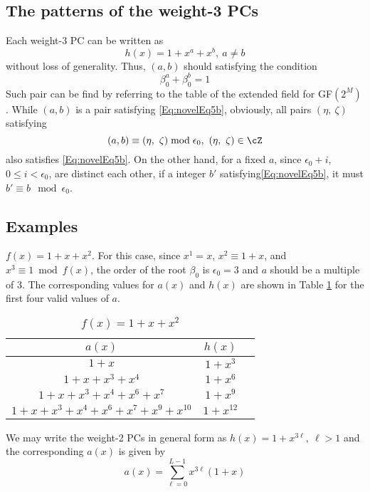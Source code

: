 \subsection{The patterns of the weight-3 PCs}

Each weight-3 PC can be written as 
\begin{equation}
h(x)=1+x^a+x^b,~a\neq b
\label{novelEqwt3}
\end{equation}
without loss of generality. 
Thus, $(a,b)$ should satisfying the condition
\begin{equation}
\beta_0^a+\beta_0^b= 1
\label{Eq:novelEq5b}
\end{equation}
Such pair can be find by referring to the table of the extended field for GF$(2^M)$. While $(a,b)$ is a pair satisfying \eqref{Eq:novelEq5b}, obviously, all pairs $(\eta,~\zeta)$ satisfying
\begin{equation}
(a,b) \equiv (\eta,~\zeta) \bmod \epsilon_0,~(\eta,~\zeta)\in \cZ
\end{equation}
also satisfies \eqref{Eq:novelEq5b}. On the other hand, for a fixed $a$, since $\epsilon_0+i$, $0 \leq i < \epsilon_0$, are distinct each other, if a integer $b'$ satisfying\eqref{Eq:novelEq5b}, it must $b'\equiv b \mod \epsilon_0$.

\subsection{Examples}


\begin{example}$f(x)=1+x+x^2$.\newline 
	For this case, since $x^1=x$, $x^2 \equiv 1+x$, and $x^3 \equiv 1 \bmod f(x)$, the order of the root $\beta_0$ is $\epsilon_0=3$ and $a$ should be a multiple of $3$. The corresponding values for $a(x)$ and $h(x)$ are shown in Table \ref{novelTab2} for the first four valid values of $a$.
	\begin{table}[htbp]
		\caption{$f(x)=1+x+x^2$}
		\centering
		\begin{tabular}{c c c} 
			$a(x)$ & $h(x)$ \\ [0.5ex] 
			\hline\hline
			$1+x$
			& $1+x^{3}$ \\
			\hline
			$1+x+x^3+x^4$
			& $1+x^{6}$ 
			\\
			\hline
			$1+x+x^3+x^4+x^6+x^{7}$ 
			&  $1+x^{9}$ 
			\\
			\hline
			$1+x+x^3+x^4+x^6+x^{7}+x^9+x^{10}$
			&  $1+x^{12}$ \\
		\end{tabular}
		\label{novelTab2}
	\end{table}
	\label{ex-2}
	
	We may write the weight-2 PCs in general form as $h(x)=1+x^{3\ell},~\ell>1$ and the corresponding $a(x)$ is given by 
	\begin{equation*}
	a(x)=\sum_{\ell=0}^{L-1} x^{3\ell}(1+x)
	\end{equation*}
	\label{ex-1}
\end{example}




